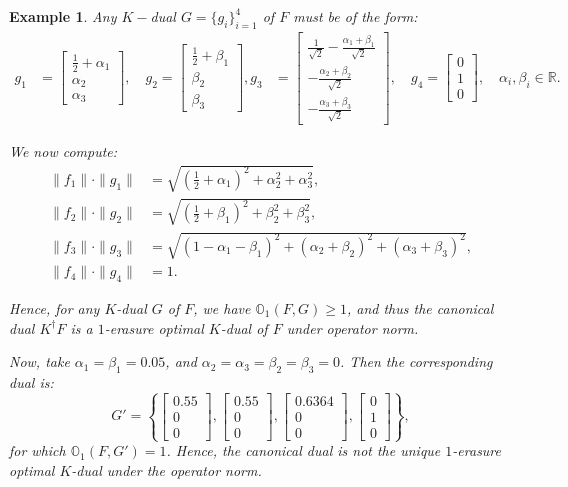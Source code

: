 \documentclass[final,1p,times]{elsarticle}
\newtheorem{example}[thm]{Example}
\begin{document}
\begin{example}
Any $K-$dual $G = \{g_i\}_{i=1}^4$ of $F$ must be of the form:
\[
\begin{aligned}
g_1 &= \begin{bmatrix} \frac{1}{2} + \alpha_1 \\ \alpha_2 \\ \alpha_3 \end{bmatrix}, \quad
g_2 = \begin{bmatrix} \frac{1}{2} + \beta_1 \\ \beta_2 \\ \beta_3 \end{bmatrix}, 
g_3 &= \begin{bmatrix} \frac{1}{\sqrt{2}} - \frac{\alpha_1 + \beta_1}{\sqrt{2}} \\ -\frac{\alpha_2 + \beta_2}{\sqrt{2}} \\ -\frac{\alpha_3 + \beta_3}{\sqrt{2}} \end{bmatrix}, \quad
g_4 = \begin{bmatrix} 0 \\ 1 \\ 0 \end{bmatrix}, \quad \alpha_i, \beta_i \in \mathbb{R}.
\end{aligned}
\]

We now compute:
\begin{align*}
\|f_1\| \cdot \|g_1\| &= \sqrt{\left(\frac{1}{2} + \alpha_1\right)^2 + \alpha_2^2 + \alpha_3^2}, \\
\|f_2\| \cdot \|g_2\| &= \sqrt{\left(\frac{1}{2} + \beta_1\right)^2 + \beta_2^2 + \beta_3^2}, \\
\|f_3\| \cdot \|g_3\| &= \sqrt{(1 - \alpha_1 - \beta_1)^2 + (\alpha_2 + \beta_2)^2 + (\alpha_3 + \beta_3)^2}, \\
\|f_4\| \cdot \|g_4\| &= 1.
\end{align*}

Hence, for any $K$-dual $G$ of $F$, we have $\mathbb{O}_{1}(F, G) \geq 1$, and thus the canonical dual $K^\dag F$ is a $1$-erasure optimal $K$-dual of $F$ under operator norm.

Now, take $\alpha_1 = \beta_1 = 0.05$, and $\alpha_2 = \alpha_3 = \beta_2 = \beta_3 = 0$. Then the corresponding dual is:
\[
G' = \left\{
\begin{bmatrix} 0.55 \\ 0 \\ 0 \end{bmatrix}, 
\begin{bmatrix} 0.55 \\ 0 \\ 0 \end{bmatrix}, 
\begin{bmatrix} 0.6364 \\ 0 \\ 0 \end{bmatrix}, 
\begin{bmatrix} 0 \\ 1 \\ 0 \end{bmatrix}
\right\},
\]
for which $\mathbb{O}_{1}(F, G') = 1$. Hence, the canonical dual is \emph{not} the unique $1$-erasure optimal $K$-dual under the operator norm.


\end{example}
\end{document}
